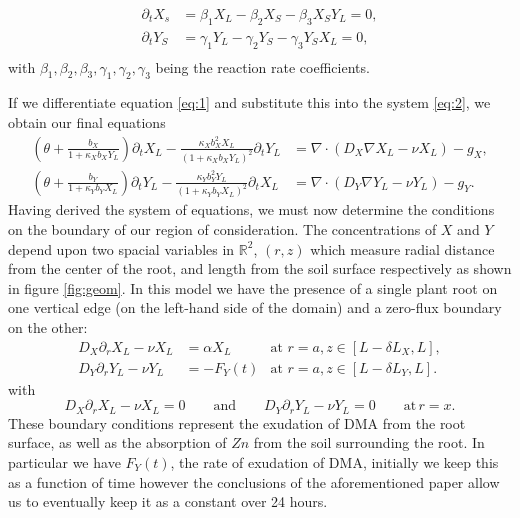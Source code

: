 \documentclass[11pt]{article}
\newcommand{\R}{\mathbb{R}}
\begin{document}
\begin{equation}
    \begin{aligned}
        \partial_t X_s&=\beta_1X_L-\beta_2X_S-\beta_3X_SY_L=0,\\
        \partial_tY_S&=\gamma_1Y_L-\gamma_2Y_S-\gamma_3Y_SX_L=0,\\
    \end{aligned}
    \label{eq:2}
\end{equation}
with $\beta_1,\beta_2,\beta_3,\gamma_1,\gamma_2,\gamma_3$ being the reaction rate coefficients.


If we differentiate equation \eqref{eq:1} and substitute this into the system \eqref{eq:2}, we obtain our final equations
\begin{align}
    \left( \theta + \frac{b_X}{1 + \kappa_X b_X Y_L} \right) \partial_t X_L - \frac{\kappa_X b_X^2 X_L}{(1+\kappa_X b_X Y_L)^2} \partial_t Y_L &=
    \nabla \cdot ( D_X \nabla X_L - \nu X_L  ) - g_X,
    \label{eq:sys-Zn-X-Omega}
    \\
    \left( \theta + \frac{b_Y}{1 + \kappa_Y b_Y X_L} \right) \partial_t Y_L - \frac{\kappa_Y b_Y^2 Y_L}{(1+\kappa_Y b_Y X_L)^2} \partial_t X_L &=
    \nabla \cdot ( D_Y \nabla Y_L - \nu Y_L  ) - g_Y.
\end{align}
Having derived the system of equations, we must now determine the conditions on the boundary of our region of consideration.
The concentrations of $X$ and $Y$ depend upon two spacial variables in $\R^2$, $(r,z)$ which measure radial distance from the center of the  root, and length from the soil surface respectively as shown in figure \ref{fig:geom}. 
In this model we have the presence of a single plant root on one vertical edge (on the left-hand side of the domain) and a zero-flux boundary on the other:
\begin{align}
    D_X \partial_r X_L - \nu X_L &= \alpha X_L & \text{at } r = a, z \in [L - \delta L_X, L], \\
    D_Y \partial_r Y_L - \nu Y_L &= -F_Y(t) &\text{at } r = a, z \in [L - \delta L_Y, L].
\end{align}
with
\begin{equation}
     D_X \partial_r X_L - \nu X_L = 0
    \qquad\text{and}\qquad
    D_Y \partial_r Y_L - \nu Y_L = 0 \qquad\text{at}\, r = x.
\end{equation}
These boundary conditions represent the exudation of DMA from the root surface, as well as the absorption of $Zn$ from the soil surrounding the root. In particular we have $F_Y(t)$, the rate of exudation of DMA, initially we keep this as a function of time however the conclusions of the aforementioned paper allow us to eventually keep it as a constant over 24 hours.
\end{document}
